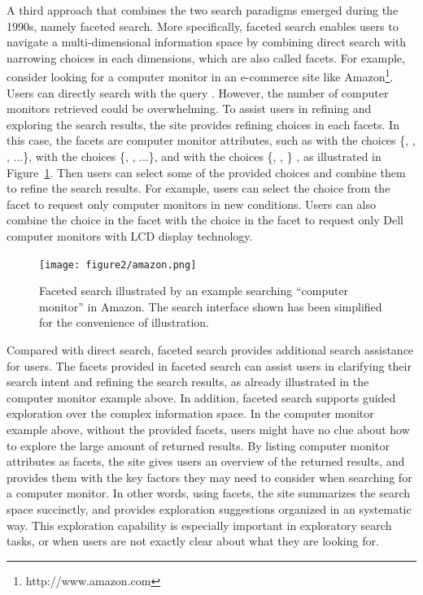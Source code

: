 A third approach that combines the two search paradigms emerged during the 1990s, namely faceted search. More specifically, faceted search enables users to navigate a multi-dimensional information space by combining direct search with narrowing choices in each dimensions, which are also called facets. For example, consider looking for a computer monitor in an e-commerce site like Amazon\footnote{http://www.amazon.com}. Users can directly search with the query . However, the number of computer monitors retrieved could be overwhelming. To assist users in refining and exploring the search results, the site provides refining choices in each facets. In this case, the facets are computer monitor attributes, such as  with the choices \{, , , ...\},  with the choices \{, , ...\}, and  with the choices \{, , \}
, 
as illustrated in Figure~\ref{fig:intro-amazon}. Then users can select some of the provided choices and combine them to refine the search results. For example, users can select the choice  from the facet  to request only computer monitors in new conditions. Users can also combine the choice  in the facet  with the choice  in the facet  to request only Dell computer monitors with LCD display technology.

\begin{figure}[!ht]
\centering
\texttt{[image: figure2/amazon.png]}
\caption{Faceted search illustrated by an example searching ``computer monitor'' in Amazon. The search interface shown has been simplified for the convenience of illustration.}
\label{fig:intro-amazon}
\end{figure}

Compared with direct search, faceted search provides additional search assistance for users. The facets provided in faceted search can assist users in clarifying their search intent and refining the search results, as already illustrated in the computer monitor example above. In addition, faceted search supports guided exploration over the complex information space. In the computer monitor example above, without the provided facets, users might have no clue about how to explore the large amount of returned results. By listing computer monitor attributes as facets, the site gives users an overview of the returned results, and provides them with the key factors they may need to consider when searching for a computer monitor. In other words, using facets, the site summarizes the search space succinctly, and provides exploration suggestions organized in an systematic way. This exploration capability is especially important in exploratory search tasks, or when users are not exactly clear about what they are 
looking for.

